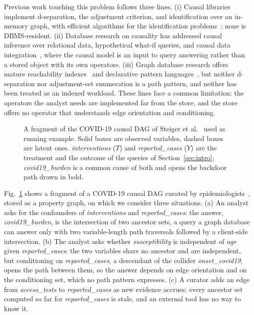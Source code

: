 Previous work touching this problem follows three lines. (i) Causal
libraries~\cite{sharma2020dowhy,textor2016dagitty,ankan2024pgmpy,zheng2024causallearn,lee2023ananke}
implement d-separation, the adjustment criterion, and identification over an
in-memory graph, with efficient algorithms for the identification
problems~\cite{vanderzander2019separators,vanderzander2020minimal}; none is
DBMS-resident. (ii) Database research on causality has addressed causal
inference over relational data, hypothetical what-if queries, and causal data
integration~\cite{salimi2018hypdb,salimi2020carl,galhotra2022hyper,youngmann2023integration},
where the causal model is an input to query answering rather than a stored
object with its own operators. (iii) Graph database research offers mature
reachability indexes~\cite{yildirim2010grail,cheng2013tflabel,zhou2017dagreduction}
and declarative pattern languages~\cite{deutsch2022gql}, but neither
d-separation nor adjustment-set enumeration is a path pattern, and neither has
been treated as an indexed workload. These lines face a common limitation:
the operators the analyst needs are implemented far from the store, and the
store offers no operator that understands edge orientation and conditioning.

\begin{figure}[t]
    \centering
    
    \caption{A fragment of the COVID-19 causal DAG of Steiger et
    al.~\cite{steiger2021covid} used as running example. Solid boxes are
    observed variables, dashed boxes are latent ones. \textit{interventions}
    ($T$) and \textit{reported\_cases} ($Y$) are the treatment and the outcome
    of the queries of Section~\ref{sec:intro}; \textit{covid19\_burden} is a
    common cause of both and opens the backdoor path drawn in bold.}
    \label{fig:example}
\end{figure}

Fig.~\ref{fig:example} shows a fragment of a COVID-19 causal DAG curated by
epidemiologists~\cite{steiger2021covid}, stored as a property graph, on
which we consider three situations. (a) An analyst asks for the confounders
of \textit{interventions} and \textit{reported\_cases}: the answer,
\textit{covid19\_burden}, is the intersection of two ancestor sets, a query a
graph database can answer only with two variable-length path traversals
followed by a client-side intersection. (b) The analyst asks whether
\textit{susceptibility} is independent of \textit{age} given
\textit{reported\_cases}: the two variables share no ancestor and are
independent, but conditioning on \textit{reported\_cases}, a descendant of the
collider \textit{onset\_covid19}, opens the path between them, so the answer
depends on edge orientation and on the conditioning set, which no path pattern
expresses. (c) A curator adds an edge from \textit{access\_tests} to
\textit{reported\_cases} as new evidence accrues: every ancestor set computed
so far for \textit{reported\_cases} is stale, and an external tool has no way
to know it.

